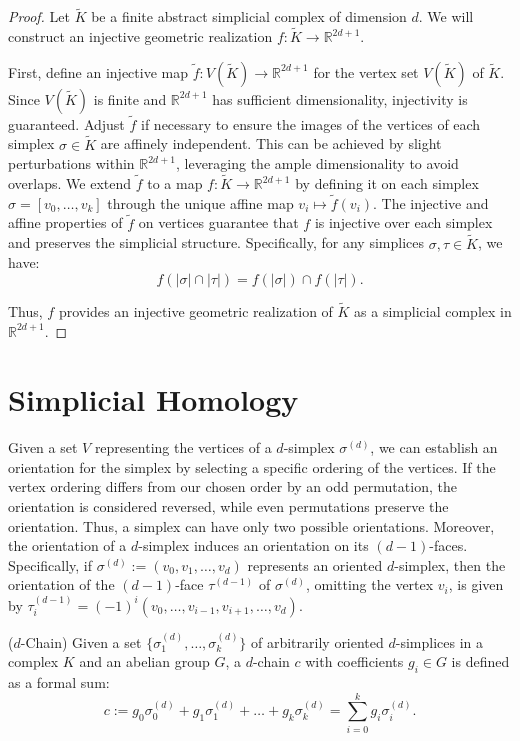 \begin{proof}
	Let $\tilde{K}$ be a finite abstract simplicial complex of dimension $d$. We
	will construct an injective geometric realization
	$f: \tilde{K}\to \mathbb{R}^{2d+1}$.

	First, define an injective map $\tilde{f}: V(\tilde{K}) \to \mathbb{R}^{2d+1}$
	for the vertex set $V(\tilde{K})$ of $\tilde{K}$. Since $V(\tilde{K})$ is
	finite and $\mathbb{R}^{2d+1}$ has sufficient dimensionality, injectivity is guaranteed.
	Adjust $\tilde{f}$ if necessary to ensure the images of the vertices of each
	simplex $\sigma \in \tilde{K}$ are affinely independent. This can be achieved by
	slight perturbations within $\mathbb{R}^{2d+1}$, leveraging the ample
	dimensionality to avoid overlaps. We extend $\tilde{f}$ to a map $f: \tilde{K}\to \mathbb{R}^{2d+1}$ by defining
	it on each simplex $\sigma = [v_{0}, \ldots, v_{k}]$ through the unique affine
	map $v_{i} \mapsto \tilde{f}(v_{i})$. The injective and affine properties of $\tilde
	{f}$ on vertices guarantee that $f$ is injective over each simplex and preserves
	the simplicial structure. Specifically, for any simplices $\sigma, \tau \in \tilde
	{K}$, we have:
	\[
		f(|\sigma| \cap |\tau|) = f(|\sigma|) \cap f(|\tau|).
	\]

	Thus, $f$ provides an injective geometric realization of $\tilde{K}$ as a simplicial
	complex in $\mathbb{R}^{2d+1}$.
\end{proof}

\section{Simplicial Homology}
\label{Simplicial Homology} Given a set $V$ representing the vertices of a $d$-simplex
$\sigma^{(d)}$, we can establish an orientation for the simplex by selecting a
specific ordering of the vertices. If the vertex ordering differs from our chosen
order by an odd permutation, the orientation is considered reversed, while even permutations
preserve the orientation. Thus, a simplex can have only two possible orientations.
Moreover, the orientation of a $d$-simplex induces an orientation on its $(d-1)$-faces.
Specifically, if $\sigma^{(d)}:= (v_{0}, v_{1}, \ldots, v_{d})$ represents an oriented
$d$-simplex, then the orientation of the $(d-1)$-face $\tau^{(d-1)}$ of
$\sigma^{(d)}$, omitting the vertex $v_{i}$, is given by
$\tau_{i}^{(d-1)}= (-1)^{i} (v_{0}, \ldots, v_{i-1}, v_{i+1}, \ldots, v_{d})$.

\begin{definition}
	{($d$-Chain) \cite[\S 2.3]{zomorodian2004computing}} \label{$d$-Chain} Given a
	set $\{\sigma_{1}^{(d)}, \ldots, \sigma_{k}^{(d)}\}$ of arbitrarily oriented $d$-simplices
	in a complex $K$ and an abelian group $G$, a $d$-chain $c$ with coefficients
	$g_{i} \in G$ is defined as a formal sum:
	\begin{equation}
		c := g_{0}\sigma^{(d)}_{0}+ g_{1}\sigma^{(d)}_{1}+ \ldots + g_{k}\sigma^{(d)}
		_{k}= \sum_{i=0}^{k}g_{i}\sigma^{(d)}_{i}.
	\end{equation}
\end{definition}

